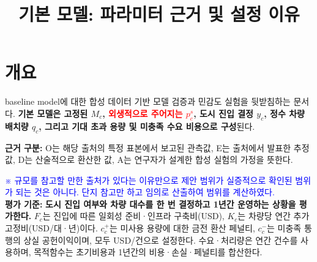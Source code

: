 \documentclass[10pt,a4paper]{article}
\title{기본 모델: 파라미터 근거 및 설정 이유}
\begin{document}
\maketitle


\section{개요}
baseline model에 대한 합성 데이터 기반 모델 검증과 민감도 실험을 뒷받침하는 문서다. \textbf{기본 모델은 고정된 $M_c$, \textcolor{red}{외생적으로 주어지는 $p_c^s$}, 도시 진입 결정 $y_c$, 정수 차량 배치량 $q_c$, 그리고 기대 초과 용량 및 미충족 수요 비용으로 구성}된다.

\textbf{근거 구분:} %
O는 해당 출처의 특정 표본에서 보고된 관측값, E는 출처에서 발표한 추정값, D는 산술적으로 환산한 값, A는 연구자가 설계한 합성 실험의 가정을 뜻한다. 

\textcolor{blue}{※ 규모를 참고할 만한 출처가 있다는 이유만으로 제안 범위가 실증적으로 확인된 범위가 되는 것은 아니다. 단지 참고만 하고 임의로 산출하여 범위를 계산하였다.} \\

\textbf{평가 기준:} \textbf{도시 진입 여부와 차량 대수를 한 번 결정하고 1년간 운영하는 상황을 평가한다.} \(F_c\)는 진입에 따른 일회성 준비·인프라 구축비(USD), \(K_c\)는 차량당 연간 추가 고정비(USD/대·년)이다. \(c_c^+\)는 미사용 용량에 대한 금전 환산 페널티, \(c_c^-\)는 미충족 통행의 상실 공헌이익이며, 모두 USD/건으로 설정한다. 수요·처리량은 연간 건수를 사용하며, 목적함수는 초기비용과 1년간의 비용·손실·페널티를 합산한다.
\end{document}
